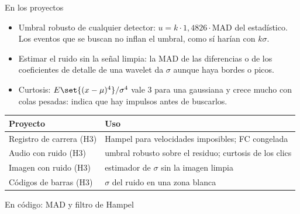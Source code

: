 \documentclass[aspectratio=169,11pt]{beamer}
\begin{document}
\begin{frame}{En los proyectos}
  \footnotesize
  \begin{itemize}
    \item \alert{Umbral robusto de cualquier detector}: $u=k\cdot1{,}4826\cdot\mathrm{MAD}$ del estadístico. Los eventos que se buscan no inflan el umbral, como sí harían con $k\sigma$.
    \item \alert{Estimar el ruido sin la señal limpia}: la MAD de las diferencias o de los coeficientes de detalle de una wavelet da $\sigma$ aunque haya bordes o picos.
    \item \alert{Curtosis}: $E\set{(x-\mu)^4}/\sigma^4$ vale 3 para una gaussiana y crece mucho con colas pesadas: indica que hay impulsos antes de buscarlos.
  \end{itemize}
  \medskip
  \begin{tabular}{@{}ll@{}}
    \toprule
    Proyecto & Uso \\ \midrule
    Registro de carrera (H3) & Hampel para velocidades imposibles; FC congelada \\
    Audio con ruido (H3) & umbral robusto sobre el residuo; curtosis de los clics \\
    Imagen con ruido (H3) & estimador de $\sigma$ sin la imagen limpia \\
    Códigos de barras (H3) & $\sigma$ del ruido en una zona blanca \\
    \bottomrule
  \end{tabular}
\end{frame}

\begin{frame}{En código: MAD y filtro de Hampel}
\end{frame}
\end{document}
